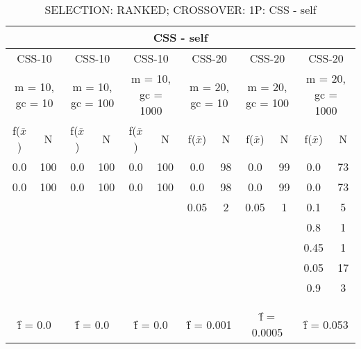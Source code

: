 \begin{table}[H]
	\centering
	\caption{SELECTION: RANKED; CROSSOVER: 1P: CSS - self}
	\begin{adjustbox}{width=1\textwidth}
		\begin{tabular}{ |c|c||c|c||c|c||c|c||c|c||c|c| }
			\hline
			\multicolumn{12}{|c|}{CSS - self} \\
			\hline
			\multicolumn{2}{|c||}{CSS-10} & \multicolumn{2}{c||}{CSS-10} & \multicolumn{2}{c||}{CSS-10} & \multicolumn{2}{c||}{CSS-20} & \multicolumn{2}{c||}{CSS-20} & \multicolumn{2}{c|}{CSS-20}\\
			\hline
			\multicolumn{2}{|c||}{m = 10, gc = 10} & \multicolumn{2}{c||}{m = 10, gc = 100} & \multicolumn{2}{c||}{m = 10, gc = 1000} & \multicolumn{2}{c||}{m = 20, gc = 10} & \multicolumn{2}{c||}{m = 20, gc = 100} & \multicolumn{2}{c|}{m = 20, gc = 1000}\\
			\hline
			f($\bar{x}$) & N & f($\bar{x}$) & N & f($\bar{x}$) & N & f($\bar{x}$) & N & f($\bar{x}$) & N & f($\bar{x}$) & N\\
			\hline
			\hline
			0.0 & 100 & 0.0 & 100 & 0.0 & 100 & 0.0 & 98 & 0.0 & 99 & 0.0 & 73\\
			\hline
			0.0 & 100 & 0.0 & 100 & 0.0 & 100 & 0.0 & 98 & 0.0 & 99 & 0.0 & 73\\
			&   &   &   &   &   & 0.05 & 2 & 0.05 & 1 & 0.1 & 5\\
			&   &   &   &   &   &   &   &   &   & 0.8 & 1\\
			&   &   &   &   &   &   &   &   &   & 0.45 & 1\\
			&   &   &   &   &   &   &   &   &   & 0.05 & 17\\
			&   &   &   &   &   &   &   &   &   & 0.9 & 3\\
			&   &   &   &   &   &   &   &   &   &   &  \\
			&   &   &   &   &   &   &   &   &   &   &  \\
			\hline
			\multicolumn{2}{|c||}{\^{f} = 0.0} & \multicolumn{2}{c||}{\^{f} = 0.0} & \multicolumn{2}{c||}{\^{f} = 0.0} & \multicolumn{2}{c||}{\^{f} = 0.001} & \multicolumn{2}{c||}{\^{f} = 0.0005} & \multicolumn{2}{c|}{\^{f} = 0.053}\\
			\hline
		\end{tabular}
	\end{adjustbox}
\end{table}

